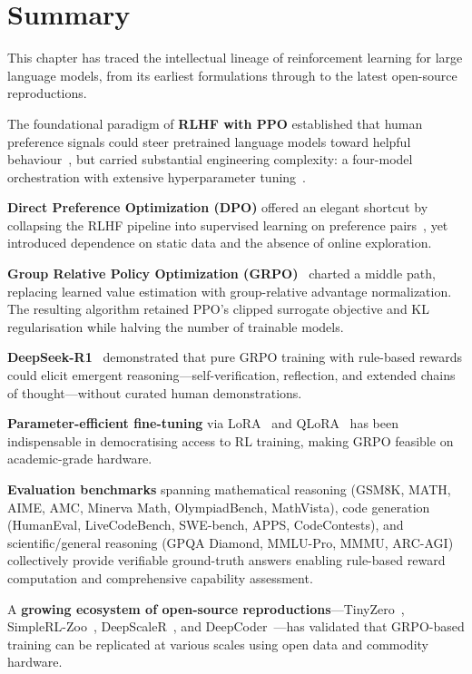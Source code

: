\documentclass[12pt,a4paper]{report}
\theoremstyle{definition}
\begin{document}
\section{Summary}
\label{sec:lit-summary}

This chapter has traced the intellectual lineage of reinforcement learning for large language models, from its earliest formulations through to the latest open-source reproductions.

The foundational paradigm of \textbf{RLHF with PPO} established that human preference signals could steer pretrained language models toward helpful behaviour~\cite{ouyang2022instructgpt}, but carried substantial engineering complexity: a four-model orchestration with extensive hyperparameter tuning~\cite{schulman2017ppo, zheng2023secrets}.

\textbf{Direct Preference Optimization (DPO)} offered an elegant shortcut by collapsing the RLHF pipeline into supervised learning on preference pairs~\cite{rafailov2023direct}, yet introduced dependence on static data and the absence of online exploration.

\textbf{Group Relative Policy Optimization (GRPO)}~\cite{shao2024deepseekmath} charted a middle path, replacing learned value estimation with group-relative advantage normalization. The resulting algorithm retained PPO's clipped surrogate objective and KL regularisation while halving the number of trainable models.

\textbf{DeepSeek-R1}~\cite{deepseek2025r1} demonstrated that pure GRPO training with rule-based rewards could elicit emergent reasoning---self-verification, reflection, and extended chains of thought---without curated human demonstrations.

\textbf{Parameter-efficient fine-tuning} via LoRA~\cite{hu2021lora} and QLoRA~\cite{dettmers2023qlora} has been indispensable in democratising access to RL training, making GRPO feasible on academic-grade hardware.

\textbf{Evaluation benchmarks} spanning mathematical reasoning (GSM8K, MATH, AIME, AMC, Minerva Math, OlympiadBench, MathVista), code generation (HumanEval, LiveCodeBench, SWE-bench, APPS, CodeContests), and scientific/general reasoning (GPQA Diamond, MMLU-Pro, MMMU, ARC-AGI) collectively provide verifiable ground-truth answers enabling rule-based reward computation and comprehensive capability assessment.

A \textbf{growing ecosystem of open-source reproductions}---TinyZero~\cite{wen2025tinyzero}, SimpleRL-Zoo~\cite{zeng2025simplerl}, DeepScaleR~\cite{luo2025deepscaler}, and DeepCoder~\cite{xu2025deepcoder}---has validated that GRPO-based training can be replicated at various scales using open data and commodity hardware.
\end{document}

